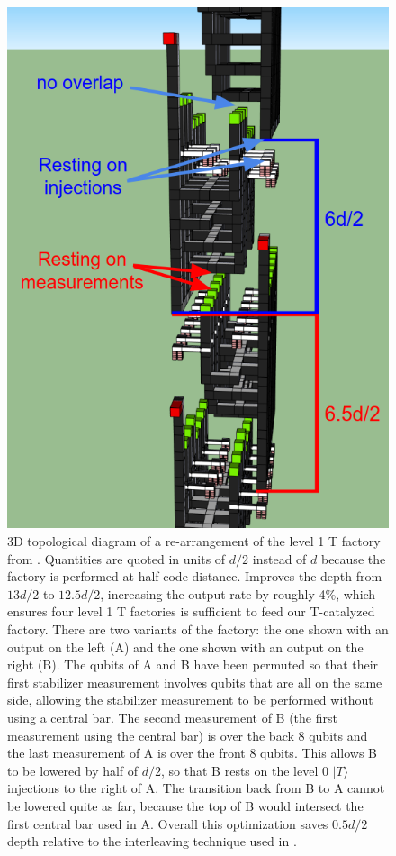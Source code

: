 \documentclass[twocolumn,accepted=2019-03-30]{quantumarticle}
\begin{document}
\begin{figure}
    \label{fig:t1-3d}
    \centering
    \includegraphics[width=\textwidth,height=\dimexpr\textheight-12\baselineskip,keepaspectratio]{t1-3d.png}
    \caption{
        3D topological diagram of a re-arrangement of the level 1 T factory from \cite{fowler2018}.
        Quantities are quoted in units of $d/2$ instead of $d$ because the factory is performed at half code distance.
        Improves the depth from $13d/2$ to $12.5d/2$, increasing the output rate by roughly 4\%, which ensures four level 1 T factories is sufficient to feed our T-catalyzed factory.
        There are two variants of the factory: the one shown with an output on the left (A) and the one shown with an output on the right (B).
        The qubits of A and B have been permuted so that their first stabilizer measurement involves qubits that are all on the same side, allowing the stabilizer measurement to be performed without using a central bar.
        The second measurement of B (the first measurement using the central bar) is over the back 8 qubits and the last measurement of A is over the front 8 qubits.
        This allows B to be lowered by half of $d/2$, so that B rests on the level 0 $|T\rangle$ injections to the right of A.
        The transition back from B to A cannot be lowered quite as far, because the top of B would intersect the first central bar used in A.
        Overall this optimization saves $0.5d/2$ depth relative to the interleaving technique used in \cite{fowler2018}.
    }
\end{figure}
\end{document}
